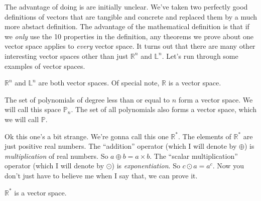The advantage of doing is are initially unclear. We've taken two perfectly good definitions of vectors that are tangible and concrete and replaced them by a much more abstact definition. The advantage of the mathematical definition is that if we \textit{only} use the 10 properties in the definition, any theorems we prove about one vector space applies to \textit{every} vector space. It turns out that there are many other interesting vector spaces other than just $\mathbb{R}^n$ and $\mathbb{L}^n$. Let's run through some examples of vector spaces.

\begin{example}
	$\mathbb{R}^n$ and $\mathbb{L}^n$ are both vector spaces. Of special note, $\mathbb{R}$ is a vector space.
\end{example}

\begin{example}
	The set of polynomials of degree less than or equal to $n$ form a vector space. We will call this space $\mathbb{P}_n$. The set of all polynomials also forms a vector space, which we will call $\mathbb{P}$.
\end{example}

\begin{example}
	Ok this one's a bit strange. We're gonna call this one $\mathbb{R}^*$. The elements of $\mathbb{R}^*$ are just positive real numbers. The ``addition'' operator (which I will denote by $\oplus$) is \textit{multiplication} of real numbers. So $a \oplus b = a \times b$. The ``scalar multiplication'' operator (which I will denote by $\odot$) is \textit{exponentiation}. So $c \odot a = a^c$. Now you don't just have to believe me when I say that, we can prove it. 
\end{example}

\begin{proposition}
	$\mathbb{R}^*$ is a vector space.
\end{proposition}

